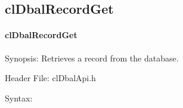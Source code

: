 \begin{flushleft}
\newpage

\subsection{clDbalRecordGet}
\hypertarget{pagedbal107}{}\paragraph{cl\-Dbal\-Record\-Get}\label{pagedbal107}
\begin{Desc}
\item[Synopsis:]Retrieves a record from the database.\end{Desc}
\begin{Desc}
\item[Header File:]clDbalApi.h\end{Desc}
\begin{Desc}
\item[Syntax:]


\end{Desc}
\end{flushleft}
